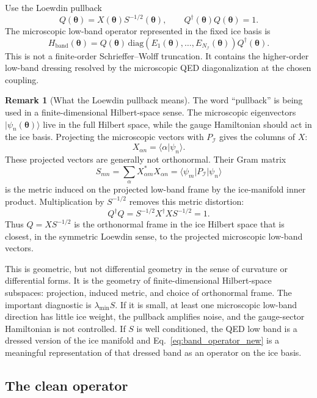 \documentclass[11pt,letterpaper]{article}
\newcommand{\btheta}{\bm \theta}
\newcommand{\ice}{\mathcal I}
\newcommand{\HB}{H_{\mathrm{band}}}
\theoremstyle{plain}
\theoremstyle{definition}
\newtheorem{remark}{Remark}
\begin{document}
Use the Loewdin pullback
\begin{equation}
Q(\btheta)=X(\btheta)S^{-1/2}(\btheta),
\qquad Q^\dagger(\btheta)Q(\btheta)=1.
\label{eq:lowdin_pullback_new}
\end{equation}
The microscopic low-band operator represented in the fixed ice basis is
\begin{equation}
\boxed{
\HB(\btheta)=
Q(\btheta)\,
\mathrm{diag}\!\left(E_1(\btheta),\ldots,E_{N_\ice}(\btheta)\right)
Q^\dagger(\btheta).
}
\label{eq:band_operator_new}
\end{equation}
This is not a finite-order Schrieffer--Wolff truncation.  It contains the
higher-order low-band dressing resolved by the microscopic QED diagonalization
at the chosen coupling.

\begin{remark}[What the Loewdin pullback means]
The word ``pullback'' is being used in a finite-dimensional Hilbert-space
sense.  The microscopic eigenvectors
$|\psi_n(\btheta)\rangle$ live in the full Hilbert space, while the gauge
Hamiltonian should act in the ice basis.  Projecting the microscopic vectors
with $P_\ice$ gives the columns of $X$:
\[
X_{\alpha n}=\langle \alpha|\psi_n\rangle .
\]
These projected vectors are generally not orthonormal.  Their Gram matrix
\[
S_{mn}=\sum_\alpha X^*_{\alpha m}X_{\alpha n}
=\langle\psi_m|P_\ice|\psi_n\rangle
\]
is the metric induced on the projected low-band frame by the ice-manifold
inner product.  Multiplication by $S^{-1/2}$ removes this metric distortion:
\[
Q^\dagger Q
=S^{-1/2}X^\dagger X S^{-1/2}
=1 .
\]
Thus $Q=XS^{-1/2}$ is the orthonormal frame in the ice Hilbert space that is
closest, in the symmetric Loewdin sense, to the projected microscopic low-band
vectors.

This is geometric, but not differential geometry in the sense of curvature or
differential forms.  It is the geometry of finite-dimensional Hilbert-space
subspaces: projection, induced metric, and choice of orthonormal frame.  The
important diagnostic is $\lambda_{\min}S$.  If it is small, at least one
microscopic low-band direction has little ice weight, the pullback amplifies
noise, and the gauge-sector Hamiltonian is not controlled.  If $S$ is well
conditioned, the QED low band is a dressed version of the ice manifold and
Eq.~\eqref{eq:band_operator_new} is a meaningful representation of that dressed
band as an operator on the ice basis.
\end{remark}

\subsection{The clean operator}
\end{document}
